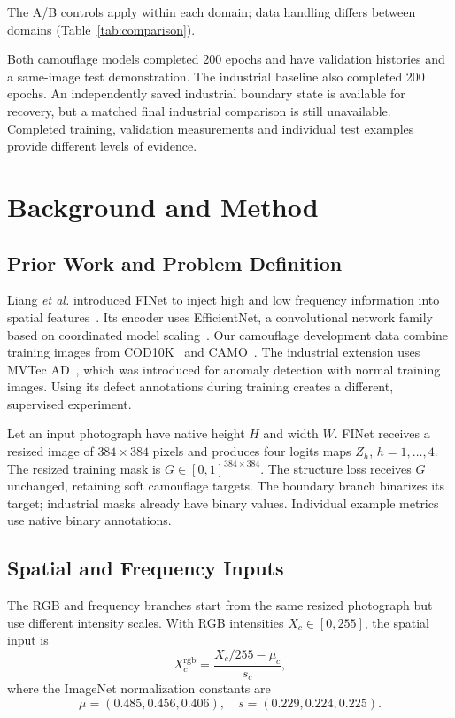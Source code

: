 \documentclass[conference,letterpaper]{IEEEtran}
\begin{document}
The A/B controls apply within each domain; data handling differs between domains (Table~\ref{tab:comparison}).

Both camouflage models completed 200 epochs and have validation histories and a same-image test demonstration. The industrial baseline also completed 200 epochs. An independently saved industrial boundary state is available for recovery, but a matched final industrial comparison is still unavailable. Completed training, validation measurements and individual test examples provide different levels of evidence.

\section{Background and Method}
\subsection{Prior Work and Problem Definition}
Liang \textit{et al.} introduced FINet to inject high and low frequency information into spatial features~\cite{finet}. Its encoder uses EfficientNet, a convolutional network family based on coordinated model scaling~\cite{efficientnet}. Our camouflage development data combine training images from COD10K~\cite{cod10k} and CAMO~\cite{camo}. The industrial extension uses MVTec AD~\cite{mvtec}, which was introduced for anomaly detection with normal training images. Using its defect annotations during training creates a different, supervised experiment.

Let an input photograph have native height $H$ and width $W$. FINet receives a resized image of $384\times384$ pixels and produces four logits maps $Z_h$, $h=1,\ldots,4$. The resized training mask is $G\in[0,1]^{384\times384}$. The structure loss receives $G$ unchanged, retaining soft camouflage targets. The boundary branch binarizes its target; industrial masks already have binary values. Individual example metrics use native binary annotations.

\subsection{Spatial and Frequency Inputs}
The RGB and frequency branches start from the same resized photograph but use different intensity scales. With RGB intensities $X_c\in[0,255]$, the spatial input is
\begin{equation}
 X^{\mathrm{rgb}}_c=\frac{X_c/255-\mu_c}{s_c},
 \label{eq:rgb}
\end{equation}
where the ImageNet normalization constants are
\[
 \mu=(0.485,0.456,0.406),\quad s=(0.229,0.224,0.225).
\]
\end{document}
